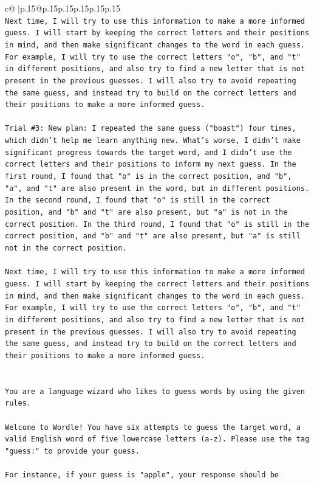 \documentclass{article}
\begin{document}
{\begin{supertabular}{c@{$\;$}|p{.15\linewidth}@{}p{.15\linewidth}p{.15\linewidth}p{.15\linewidth}p{.15\linewidth}p{.15\linewidth}}
{{{\\ 
\texttt{Next time, I will try to use this information to make a more informed guess. I will start by keeping the correct letters and their positions in mind, and then make significant changes to the word in each guess. For example, I will try to use the correct letters "o", "b", and "t" in different positions, and also try to find a new letter that is not present in the previous guesses. I will also try to avoid repeating the same guess, and instead try to build on the correct letters and their positions to make a more informed guess.} \\
\\ 
\texttt{Trial \#3: New plan: I repeated the same guess ("boast") four times, which didn't help me learn anything new. What's worse, I didn't make significant progress towards the target word, and I didn't use the correct letters and their positions to inform my next guess. In the first round, I found that "o" is in the correct position, and "b", "a", and "t" are also present in the word, but in different positions. In the second round, I found that "o" is still in the correct position, and "b" and "t" are also present, but "a" is not in the correct position. In the third round, I found that "o" is still in the correct position, and "b" and "t" are also present, but "a" is still not in the correct position. } \\
\\ 
\texttt{Next time, I will try to use this information to make a more informed guess. I will start by keeping the correct letters and their positions in mind, and then make significant changes to the word in each guess. For example, I will try to use the correct letters "o", "b", and "t" in different positions, and also try to find a new letter that is not present in the previous guesses. I will also try to avoid repeating the same guess, and instead try to build on the correct letters and their positions to make a more informed guess.} \\
\\ 
\\ 
\texttt{You are a language wizard who likes to guess words by using the given rules.} \\
\\ 
\texttt{Welcome to Wordle! You have six attempts to guess the target word, a valid English word of five lowercase letters (a{-}z). Please use the tag "guess:" to provide your guess.} \\
\\ 
\texttt{For instance, if your guess is "apple", your response should be} \\
}}}
\end{supertabular}}
\end{document}
